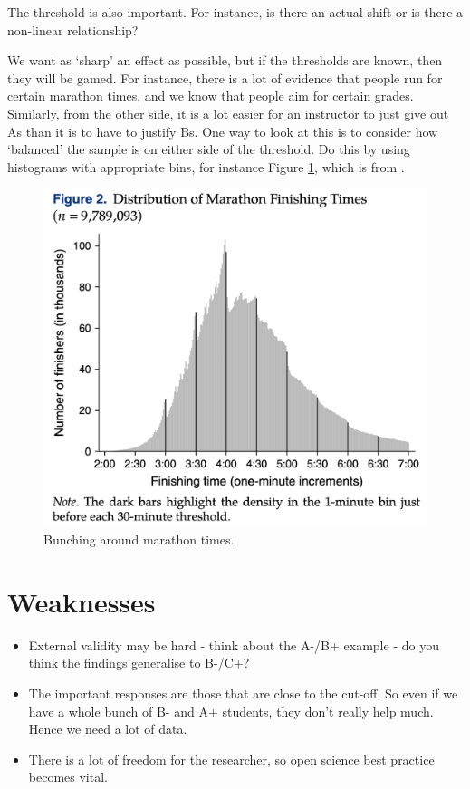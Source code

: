 \documentclass[
]{book}
\providecommand{\tightlist}{%
  \setlength{\itemsep}{0pt}\setlength{\parskip}{0pt}}
\begin{document}
The threshold is also important. For instance, is there an actual shift or is there a non-linear relationship?

We want as `sharp' an effect as possible, but if the thresholds are known, then they will be gamed. For instance, there is a lot of evidence that people run for certain marathon times, and we know that people aim for certain grades. Similarly, from the other side, it is a lot easier for an instructor to just give out As than it is to have to justify Bs. One way to look at this is to consider how `balanced' the sample is on either side of the threshold. Do this by using histograms with appropriate bins, for instance Figure \ref{fig:marathontimes}, which is from \citet{allen2017reference}.

\begin{figure}
\includegraphics[width=0.9\linewidth]{figures/marathontimes} \caption{Bunching around marathon times.}\label{fig:marathontimes}
\end{figure}

\hypertarget{weaknesses}{%
\section{Weaknesses}\label{weaknesses}}

\begin{itemize}
\tightlist
\item
  External validity may be hard - think about the A-/B+ example - do you think the findings generalise to B-/C+?
\item
  The important responses are those that are close to the cut-off. So even if we have a whole bunch of B- and A+ students, they don't really help much. Hence we need a lot of data.
\item
  There is a lot of freedom for the researcher, so open science best practice becomes vital.
\end{itemize}
\end{document}
